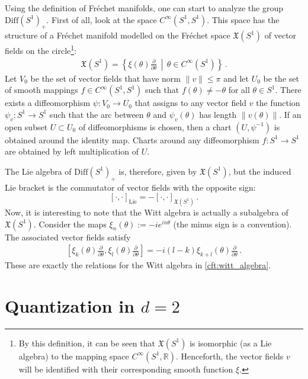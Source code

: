     Using the definition of Fr\'echet manifolds, one can start to analyze the group $\mathrm{Diff}(S^1)_+$. First of all, look at the space $C^\infty(S^1,S^1)$. This space has the structure of a Fr\'echet manifold modelled on the Fr\'echet space $\mathfrak{X}(S^1)$ of vector fields on the circle\footnote{By this definition, it can be seen that $\mathfrak{X}(S^1)$ is isomorphic (as a Lie algebra) to the mapping space $C^\infty(S^1,\mathbb{R})$. Henceforth, the vector fields $v$ will be identified with their corresponding smooth function $\xi$.}:
    \begin{gather}
        \mathfrak{X}(S^1) = \left\{\xi(\theta)\frac{\partial}{\partial\theta}\,\middle\vert\,\theta\in C^\infty(S^1)\right\}\,.
    \end{gather}
    Let $V_0$ be the set of vector fields that have norm $\|v\|\leq\pi$ and let $U_0$ be the set of smooth mappings $f\in C^\infty(S^1,S^1)$ such that $f(\theta)\neq-\theta$ for all $\theta\in S^1$. There exists a diffeomorphism $\psi:V_0\rightarrow U_0$ that assigns to any vector field $v$ the function $\psi_v:S^1\rightarrow S^1$ such that the arc between $\theta$ and $\psi_v(\theta)$ has length $\|v(\theta)\|$. If an open subset $U\subset U_0$ of diffeomorphisms is chosen, then a chart $(U,\psi^{-1})$ is obtained around the identity map. Charts around any diffeomorphism $f:S^1\rightarrow S^1$ are obtained by left multiplication of $U$.

    The Lie algebra of $\mathrm{Diff}(S^1)_+$ is, therefore, given by $\mathfrak{X}(S^1)$, but the induced Lie bracket is the commutator of vector fields with the opposite sign: \[[\cdot,\cdot]_{\text{Lie}} = -[\cdot,\cdot]_{\mathfrak{X}(S^1)}\,.\] Now, it is interesting to note that the Witt algebra is actually a subalgebra of $\mathfrak{X}(S^1)$. Consider the maps $\xi_n(\theta):=-ie^{in\theta}$ (the minus sign is a convention). The associated vector fields satisfy
    \begin{gather}
        \left[\xi_k(\theta)\frac{\partial}{\partial\theta}, \xi_l(\theta)\frac{\partial}{\partial\theta}\right] = -i(l-k)\xi_{k+l}(\theta)\frac{\partial}{\partial\theta}\,.
    \end{gather}
    These are exactly the relations for the Witt algebra in \cref{cft:witt_algebra}.

\section{\texorpdfstring{Quantization in $d=2$}{Quantization in d = 2}}

